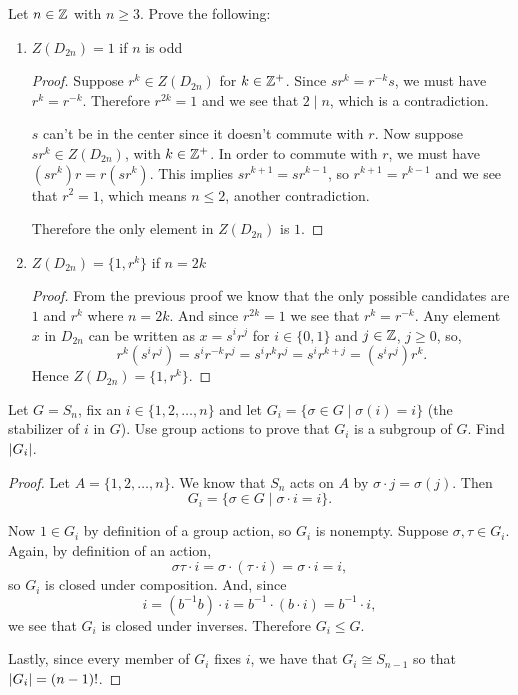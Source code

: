  Let $n\in\mathbb{Z}$ with $n\geq3$. Prove the following:
\label{exercise:center-of-D2n}
\begin{enumerate}
\item $Z(D_{2n}) = 1$ if $n$ is odd
  \begin{proof}
    Suppose $r^k\in Z(D_{2n})$ for $k\in\mathbb{Z}^+$. Since $sr^k = r^{-k}s$,
    we must have $r^k = r^{-k}$. Therefore $r^{2k} = 1$ and we see
    that $2 \mid n$, which is a contradiction.

    $s$ can't be in the center since it doesn't commute with $r$. Now
    suppose $sr^k\in Z(D_{2n})$, with $k\in\mathbb{Z}^+$. In order to commute
    with $r$, we must have $(sr^k)r = r(sr^k)$. This implies
    $sr^{k+1} = sr^{k-1}$, so $r^{k+1} = r^{k-1}$ and we see that
    $r^2 = 1$, which means $n \leq 2$, another contradiction.

    Therefore the only element in $Z(D_{2n})$ is $1$.
  \end{proof}
\item $Z(D_{2n}) = \{1,r^k\}$ if $n = 2k$
  \begin{proof}
    From the previous proof we know that the only possible candidates
    are $1$ and $r^k$ where $n = 2k$. And since $r^{2k} = 1$ we see
    that $r^k = r^{-k}$. Any element $x$ in $D_{2n}$ can be written as
    $x = s^ir^j$ for $i\in\{0,1\}$ and $j\in\mathbb{Z}$, $j\geq 0$, so,
    \begin{equation*}
      r^k(s^ir^j) = s^ir^{-k}r^j = s^ir^kr^j = s^ir^{k+j} = (s^ir^j)r^k.
    \end{equation*}
    Hence $Z(D_{2n}) = \{1, r^k\}$.
  \end{proof}
\end{enumerate}

 Let $G = S_n$, fix an $i\in\{1,2,\dots,n\}$ and let
$G_i = \{\sigma\in G\mid\sigma(i) = i\}$ (the stabilizer of $i$ in
$G$). Use group actions to prove that $G_i$ is a subgroup of $G$. Find
$\lvert{G_i}\rvert$.
\begin{proof}
  Let $A = \{1,2,\dots,n\}$. We know that $S_n$ acts on $A$ by
  $\sigma\cdot j = \sigma(j)$. Then
  \begin{equation*}
    G_i = \{\sigma\in G\mid \sigma\cdot i = i\}.
  \end{equation*}

  Now $1\in G_i$ by definition of a group action, so $G_i$ is
  nonempty. Suppose $\sigma, \tau\in G_i$. Again, by definition of an
  action,
  \begin{equation*}
    \sigma\tau\cdot i = \sigma\cdot(\tau\cdot i) = \sigma\cdot i = i,
  \end{equation*}
  so $G_i$ is closed under composition. And, since
  \begin{equation*}
    i = (b^{-1}b)\cdot i = b^{-1}\cdot(b\cdot i) = b^{-1}\cdot i,
  \end{equation*}
  we see that $G_i$ is closed under inverses. Therefore $G_i\leq G$.

  Lastly, since every member of $G_i$ fixes $i$, we have that
  $G_i\cong S_{n-1}$ so that $\lvert{G_i}\rvert = (n-1)!$.
\end{proof}

